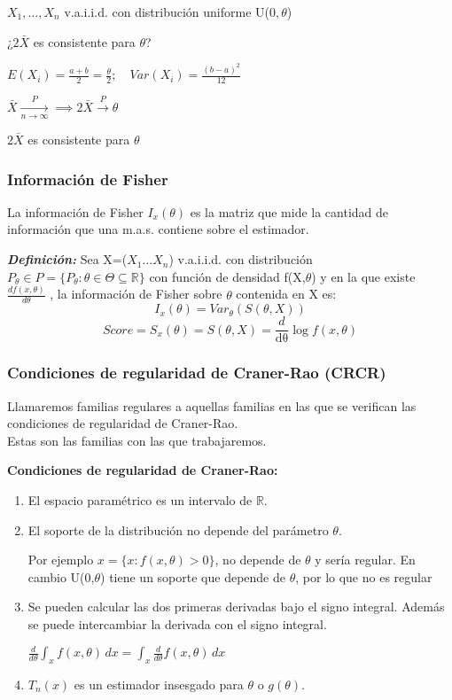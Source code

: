 $X_1, \dots, X_n$ v.a.i.i.d. con distribución uniforme U($0,\theta$)

¿$2 \bar{X}$ es consistente para $\theta$?

\(
E(X_i)=\frac{a+b}{2}=\frac{\theta}{2};\quad Var(X_i)=\frac{(b-a)^2}{12}
\)

$\bar{X} \xrightarrow[n \to \infty]{P} \implies 2 \bar{X} \xrightarrow{P} \theta
$

$2 \bar{X}$ es consistente para $\theta$
\newpage

\subsubsection{Información de Fisher}

La información de Fisher $I_x(\theta)$ es la matriz que mide la cantidad
de información que una m.a.s. contiene sobre el estimador.

\textbf{\textit{Definición: }} Sea X=($X_1 \dots X_n$) v.a.i.i.d. con distribución
$P_\theta \in P=\{P_\theta : \theta \in \Theta \subseteq \mathbb{R}\}$
con función de densidad f(X,$\theta$) y en la que existe $\frac{d f(x,\theta)}{d \theta}$
, la información de Fisher sobre $\theta$ contenida en X es:
\[
I_x(\theta) = Var_\theta (S(\theta,X))
\]
\[
Score=S_x(\theta)=S(\theta,X)=\frac{d}{\mathrm{d\theta}}
\log f(x,\theta)
\]
\subsubsection{Condiciones de regularidad de Craner-Rao (CRCR)}

Llamaremos familias regulares a aquellas familias en las que se verifican las 
condiciones de regularidad de Craner-Rao.
\\ Estas son las familias con las que trabajaremos.

\textbf{Condiciones de regularidad de Craner-Rao:}
\begin{enumerate}
    \item El espacio paramétrico es un intervalo de $\mathbb{R}$.
    \item El soporte de la distribución no depende del parámetro $\theta$.
    
    Por ejemplo $x=\{x:f(x,\theta) > 0 \}$, no depende de $\theta$ y sería regular. En cambio U(0,$\theta$) 
    tiene un soporte que depende de $\theta$, por lo que no es regular
    \item Se pueden calcular las dos primeras derivadas bajo el signo integral.
     Además se puede intercambiar la derivada con el signo integral.
     
    \(
    \frac{d}{d \theta} \int_{x} f(x,\theta)  \,dx =
    \int_{x} \frac{d}{d \theta} f(x,\theta)  \,dx
    \)
    \item $T_n(x)$ es un estimador insesgado para $\theta$ o $g(\theta)$.
\end{enumerate}


